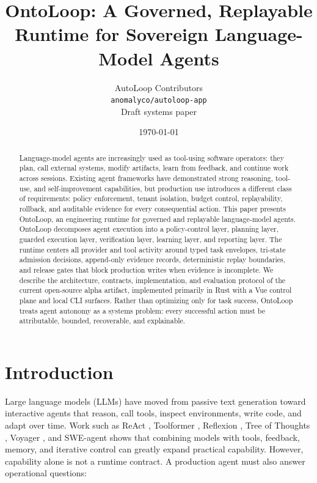 \documentclass[11pt]{article}
\title{OntoLoop: A Governed, Replayable Runtime for Sovereign Language-Model Agents}
\author{
AutoLoop Contributors\\
\texttt{anomalyco/autoloop-app}\\
Draft systems paper
}
\date{\today}
\begin{document}
\maketitle

\begin{abstract}
Language-model agents are increasingly used as tool-using software operators: they
plan, call external systems, modify artifacts, learn from feedback, and continue work
across sessions. Existing agent frameworks have demonstrated strong reasoning,
tool-use, and self-improvement capabilities, but production use introduces a
different class of requirements: policy enforcement, tenant isolation, budget
control, replayability, rollback, and auditable evidence for every consequential
action. This paper presents OntoLoop, an engineering runtime for governed and
replayable language-model agents. OntoLoop decomposes agent execution into a
policy-control layer, planning layer, guarded execution layer, verification layer,
learning layer, and reporting layer. The runtime centers all provider and tool
activity around typed task envelopes, tri-state admission decisions, append-only
evidence records, deterministic replay boundaries, and release gates that block
production writes when evidence is incomplete. We describe the architecture,
contracts, implementation, and evaluation protocol of the current open-source
alpha artifact, implemented primarily in Rust with a Vue control plane and local
CLI surfaces. Rather than optimizing only for task success, OntoLoop treats agent
autonomy as a systems problem: every successful action must be attributable,
bounded, recoverable, and explainable.
\end{abstract}

\section{Introduction}

Large language models (LLMs) have moved from passive text generation toward
interactive agents that reason, call tools, inspect environments, write code, and
adapt over time. Work such as ReAct \cite{yao2022react}, Toolformer
\cite{schick2023toolformer}, Reflexion \cite{shinn2023reflexion}, Tree of Thoughts
\cite{yao2023tot}, Voyager \cite{wang2023voyager}, and SWE-agent
\cite{yang2024sweagent} shows that combining models with tools, feedback, memory,
and iterative control can greatly expand practical capability. However, capability
alone is not a runtime contract. A production agent must also answer operational
questions:
\end{document}

